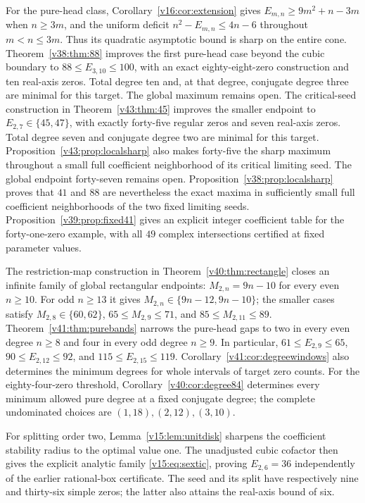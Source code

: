 \documentclass[UTF8,11pt]{ctexart}
\theoremstyle{definition}
\numberwithin{equation}{section}
\begin{document}
For the pure-head class, Corollary~\ref{v16:cor:extension} gives
$E_{m,n}\ge9m^2+n-3m$ when $n\ge3m$, and the uniform
deficit $n^2-E_{m,n}\le4n-6$ throughout $m<n\le3m$.
Thus its quadratic asymptotic bound is sharp on the entire cone.
Theorem~\ref{v38:thm:88} improves the first pure-head case beyond
the cubic boundary to $88\le E_{3,10}\le100$, with an exact
eighty-eight-zero construction and ten real-axis zeros. Total
degree ten and, at that degree, conjugate degree three are minimal
for this target. The global maximum remains open.
The critical-seed construction in Theorem~\ref{v43:thm:45}
improves the smaller endpoint to $E_{2,7}\in\{45,47\}$,
with exactly forty-five regular zeros and seven real-axis zeros.
Total degree seven and conjugate degree two are minimal for
this target. Proposition~\ref{v43:prop:localsharp} also makes
forty-five the sharp maximum throughout a small full coefficient
neighborhood of its critical limiting seed. The global endpoint
forty-seven remains open.
Proposition~\ref{v38:prop:localsharp} proves that $41$ and $88$
are nevertheless the exact maxima in sufficiently small full
coefficient neighborhoods of the two fixed limiting seeds.
Proposition~\ref{v39:prop:fixed41} gives an explicit integer
coefficient table for the forty-one-zero example, with all
$49$ complex intersections certified at fixed parameter values.

The restriction-map construction in
Theorem~\ref{v40:thm:rectangle} closes an infinite family of global
rectangular endpoints: $M_{2,n}=9n-10$ for every even $n\ge10$.
For odd $n\ge13$ it gives $M_{2,n}\in\{9n-12,9n-10\}$;
the smaller cases satisfy $M_{2,8}\in\{60,62\}$,
$65\le M_{2,9}\le71$, and $85\le M_{2,11}\le89$.
Theorem~\ref{v41:thm:purebands} narrows the pure-head gaps
to two in every even degree $n\ge8$ and four in every odd
degree $n\ge9$. In particular, $61\le E_{2,9}\le65$,
$90\le E_{2,12}\le92$, and $115\le E_{2,15}\le119$.
Corollary~\ref{v41:cor:degreewindows} also determines the
minimum degrees for whole intervals of target zero counts.
For the eighty-four-zero threshold,
Corollary~\ref{v40:cor:degree84} determines every minimum
allowed pure degree at a fixed conjugate degree; the complete
undominated choices are $(1,18),(2,12),(3,10)$.

For splitting order two, Lemma~\ref{v15:lem:unitdisk} sharpens
the coefficient stability radius to the optimal value one.
The unadjusted cubic cofactor then gives the explicit analytic
family \eqref{v15:eq:sextic}, proving $E_{2,6}=36$ independently
of the earlier rational-box certificate. The seed and its split
have respectively nine and thirty-six simple zeros; the latter
also attains the real-axis bound of six.
\end{document}
